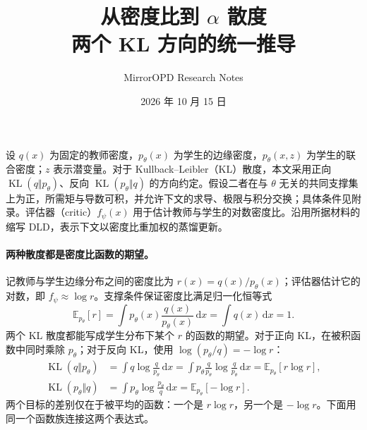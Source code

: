 \documentclass[UTF8,fontset=none,11pt,a4paper]{ctexart}
\title{从密度比到 $\alpha$ 散度\\\large 两个 KL 方向的统一推导}
\author{MirrorOPD Research Notes}
\date{2026 年 10 月 15 日}
\newcommand{\E}{\mathbb E}
\newcommand{\KL}{\operatorname{KL}}
\newcommand{\dd}{\,\mathrm d}
\begin{document}
\pagestyle{plain}
\maketitle

\noindent
设 $q(x)$ 为固定的教师密度，$p_\theta(x)$ 为学生的边缘密度，$p_\theta(x,z)$ 为学生的联合密度；$z$ 表示潜变量。对于 Kullback--Leibler（KL）散度，本文采用正向 $\KL(q\Vert p_\theta)$、反向 $\KL(p_\theta\Vert q)$ 的方向约定。假设二者在与 $\theta$ 无关的共同支撑集上为正，所需矩与导数可积，并允许下文的求导、极限与积分交换；具体条件见附录。评估器（critic）$f_\psi(x)$ 用于估计教师与学生的对数密度比。沿用所据材料的缩写 DLD，表示下文以密度比重加权的蒸馏更新。

\paragraph{两种散度都是密度比函数的期望。}
记教师与学生边缘分布之间的密度比为 $r(x)=q(x)/p_\theta(x)$；评估器估计它的对数，即 $f_\psi\approx\log r$。支撑条件保证密度比满足归一化恒等式
\setcounter{equation}{21}
\begin{equation}
\E_{p_\theta}[r]
=\int p_\theta(x)\frac{q(x)}{p_\theta(x)}\dd x
=\int q(x)\dd x
=1.
\label{eq:normalization}
\end{equation}
两个 KL 散度都能写成学生分布下某个 $r$ 的函数的期望。对于正向 KL，在被积函数中同时乘除 $p_\theta$；对于反向 KL，使用 $\log(p_\theta/q)=-\log r$：
\begin{align}
\KL(q\Vert p_\theta)
&=\int q\log\frac{q}{p_\theta}\dd x
=\int p_\theta\frac{q}{p_\theta}\log\frac{q}{p_\theta}\dd x
=\E_{p_\theta}[r\log r],
\label{eq:forward-kl}\\
\KL(p_\theta\Vert q)
&=\int p_\theta\log\frac{p_\theta}{q}\dd x
=\E_{p_\theta}[-\log r].
\label{eq:reverse-kl}
\end{align}
两个目标的差别仅在于被平均的函数：一个是 $r\log r$，另一个是 $-\log r$。下面用同一个函数族连接这两个表达式。
\end{document}
